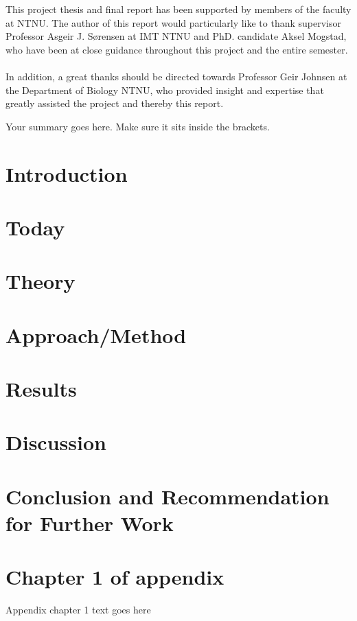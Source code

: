 \documentclass[phd,tocprelim]{thesis}
\begin{document}
\begin{acknowledgements}
This project thesis and final report has been supported by members of the faculty at NTNU. The author of this report would particularly like to thank supervisor Professor Asgeir J. Sørensen at IMT NTNU and PhD. candidate Aksel Mogstad, who have been at close guidance throughout this project and the entire semester. 
\\\\
In addition, a great thanks should be directed towards Professor Geir Johnsen at the Department of Biology NTNU, who provided insight and expertise that greatly assisted the project and thereby this report.
\end{acknowledgements}

\begin{summary}
Your summary goes here. Make sure it sits inside
the brackets.
\end{summary}

\contentspage
\tablelistpage
\figurelistpage

\normalspacing \setcounter{page}{1} 
\pagestyle{thesis} \addtolength{\parskip}{0.5\baselineskip}

\chapter{Introduction}


\chapter{Today}


\chapter{Theory}


\chapter{{Approach/Method}}


\chapter{Results}


\chapter{Discussion}


\chapter{Conclusion and Recommendation for Further Work}



\appendix
\chapter{Chapter 1 of appendix}
Appendix chapter 1 text goes here


\end{document}
